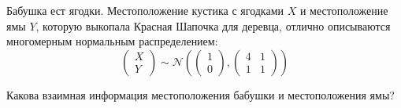 Бабушка ест ягодки. Местоположение кустика с ягодками $X$ и местоположение ямы $Y$, которую выкопала Красная Шапочка для деревца, отлично описываются многомерным нормальным распределением:
\[\begin{pmatrix} 
    X \\ 
    Y 
  \end{pmatrix}\sim \mathcal{N}\left(\begin{pmatrix} 
      1 \\ 
      0
    \end{pmatrix},
    \begin{pmatrix} 
      4 & 1 \\ 
      1 & 1
    \end{pmatrix}\right)\]

Какова взаимная информация местоположения бабушки и местоположения ямы?

